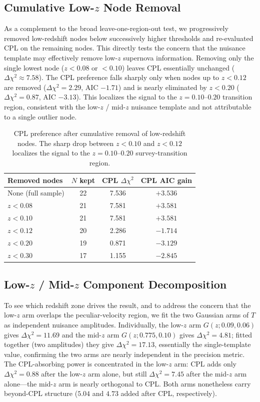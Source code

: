 \documentclass[11pt]{article}
\begin{document}
\subsection{Cumulative Low-$z$ Node Removal}

As a complement to the broad leave-one-region-out test, we progressively removed
low-redshift nodes below successively higher thresholds and re-evaluated CPL on the
remaining nodes. This directly tests the concern that the nuisance template may
effectively remove low-$z$ supernova information. Removing only the single lowest node
($z<0.08$ or $<0.10$) leaves CPL essentially unchanged ($\Delta\chi^2\approx7.58$). The
CPL preference falls sharply only when nodes up to $z<0.12$ are removed
($\Delta\chi^2=2.29$, AIC $-1.71$) and is nearly eliminated by $z<0.20$
($\Delta\chi^2=0.87$, AIC $-3.13$). This localizes the signal to the
$z=0.10$--$0.20$ transition region, consistent with the low-$z$ / mid-$z$ nuisance
template and not attributable to a single outlier node.

\begin{table}[h]
\centering
\caption{CPL preference after cumulative removal of low-redshift nodes. The sharp drop
between $z<0.10$ and $z<0.12$ localizes the signal to the $z=0.10$--$0.20$
survey-transition region.}
\label{tab:cumulative}
\begin{tabular}{lccc}
\toprule
Removed nodes & $N$ kept & CPL $\Delta\chi^2$ & CPL AIC gain \\
\midrule
None (full sample) & 22 & 7.536 & $+3.536$ \\
$z<0.08$ & 21 & 7.581 & $+3.581$ \\
$z<0.10$ & 21 & 7.581 & $+3.581$ \\
$z<0.12$ & 20 & 2.286 & $-1.714$ \\
$z<0.20$ & 19 & 0.871 & $-3.129$ \\
$z<0.30$ & 17 & 1.155 & $-2.845$ \\
\bottomrule
\end{tabular}
\end{table}

\subsection{Low-$z$ / Mid-$z$ Component Decomposition}
\label{sec:components}

To see which redshift zone drives the result, and to address the concern that the
low-$z$ arm overlaps the peculiar-velocity region, we fit the two Gaussian arms of
$T$ as independent nuisance amplitudes. Individually, the low-$z$ arm $G(z;0.09,0.06)$
gives $\Delta\chi^2=11.69$ and the mid-$z$ arm $G(z;0.775,0.10)$ gives
$\Delta\chi^2=4.81$; fitted together (two amplitudes) they give $\Delta\chi^2=17.13$,
essentially the single-template value, confirming the two arms are nearly independent
in the precision metric. The CPL-absorbing power is concentrated in the low-$z$ arm:
CPL adds only $\Delta\chi^2=0.88$ after the low-$z$ arm alone, but still
$\Delta\chi^2=7.45$ after the mid-$z$ arm alone---the mid-$z$ arm is nearly orthogonal
to CPL. Both arms nonetheless carry beyond-CPL structure ($5.04$ and $4.73$ added
after CPL, respectively).
\end{document}
